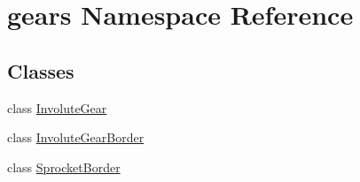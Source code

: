 \hypertarget{namespacegears}{}\section{gears Namespace Reference}
\label{namespacegears}
\subsection*{Classes}
\begin{DoxyCompactItemize}
\item 
class \hyperlink{classgears_1_1_involute_gear}{Involute\+Gear}
\item 
class \hyperlink{classgears_1_1_involute_gear_border}{Involute\+Gear\+Border}
\item 
class \hyperlink{classgears_1_1_sprocket_border}{Sprocket\+Border}
\end{DoxyCompactItemize}
